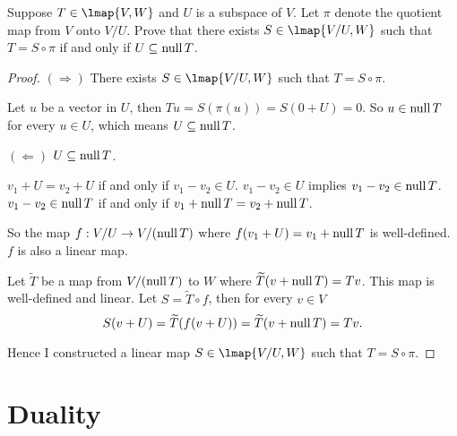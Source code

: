 \begin{exercise}
    Suppose $T\in\lmap{V, W}$ and $U$ is a subspace of $V$. Let $\pi$ denote the quotient map from $V$ onto $V/U$. Prove that there exists $S\in\lmap{V/U, W}$ such that $T = S\circ \pi$ if and only if $U\subseteq \text{null}\,{T}$.
\end{exercise}

\begin{proof}
    $(\Rightarrow)$ There exists $S\in\lmap{V/U, W}$ such that $T = S\circ \pi$.

    Let $u$ be a vector in $U$, then $Tu = S(\pi(u)) = S(0 + U) = 0$. So $u\in \text{null}\,{T}$ for every $u\in U$, which means $U\subseteq \text{null}\,{T}$.

    $(\Leftarrow)$ $U\subseteq \text{null}\,{T}$.

    $v_{1} + U = v_{2} + U$ if and only if $v_{1} - v_{2}\in U$. $v_{1} - v_{2}\in U$ implies $v_{1} - v_{2}\in \text{null}\,{T}$. $v_{1} - v_{2}\in \text{null}\,{T}$ if and only if $v_{1} + \text{null}\,{T} = v_{2} + \text{null}\,{T}$.

    So the map $f: V/U\to V/(\text{null}\,{T})$ where $f(v_{1} + U) = v_{1} + \text{null}\,{T}$ is well-defined. $f$ is also a linear map.

    Let $\widetilde{T}$ be a map from $V/(\text{null}\,{T})$ to $W$ where $\widetilde{T}(v + \text{null}\,{T}) = Tv$. This map is well-defined and linear. Let $S = \widetilde{T}\circ f$, then for every $v\in V$
    \[
        S(v + U) = \widetilde{T}(f(v + U)) = \widetilde{T}(v + \text{null}\,{T}) = Tv.
    \]

    Hence I constructed a linear map $S\in\lmap{V/U, W}$ such that $T = S\circ \pi$.
\end{proof}
\newpage

\section{Duality}

